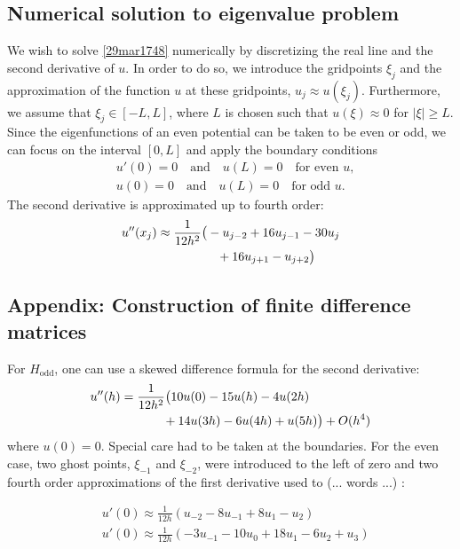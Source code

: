 \documentclass[twocolumn]{article}
\begin{document}
\begin{large}
\subsection*{Numerical solution to eigenvalue problem}
We wish to solve \eqref{29mar1748} numerically by discretizing the real line and the second derivative of $u$. In order to do so, we introduce the gridpoints $\xi_j$ and the approximation of the function $u$ at these gridpoints, $u_j\approx u(\xi_j)$. Furthermore, we assume that $\xi_j\in[-L,L]$, where $L$ is chosen such that $u(\xi)\approx 0$ for $|\xi|\geq L$. Since the eigenfunctions of an even potential can be taken to be even or odd, we can focus on the interval $[0,L]$ and apply the boundary conditions 
\begin{equation}
    \begin{split}
        &u'(0) = 0 \quad\text{and}\quad u(L) = 0 \quad \text{for even } u, \\ 
        &u(0) = 0 \quad\text{and}\quad u(L) = 0 \quad \text{for odd } u.
    \end{split}
\end{equation} 
The second derivative is approximated up to fourth order:
\begin{equation}
    \begin{split}
        u''(x_j) &\approx \frac{1}{12h^2}\big(-u_{j-2}+16u_{j-1}-30u_j \\ 
        &\hspace{1.7cm}+16u_{j+1}-u_{j+2}\big) 
    \end{split}
\end{equation}

\newpage
\newpage
\subsection*{Appendix: Construction of finite difference matrices}
For $H_\text{odd}$, one can use a skewed difference formula for the second derivative:
\begin{equation}
    \begin{split}
    u''(h) &= \frac{1}{12h^2}\big(10u(0)-15u(h)-4u(2h) \\
    &\hspace{1.2cm} +14u(3h)-6u(4h)+u(5h)\big) + O(h^4)
    \end{split}
\end{equation}
where $u(0) = 0$. 
Special care had to be taken at the boundaries. For the even case, two ghost points, $\xi_{-1}$ and $\xi_{-2}$, were introduced to the left of zero and two fourth order approximations of the first derivative used to  (... words ...) :

\begin{equation}
    \begin{split}
        &u'(0) \approx \frac{1}{12h}\left(u_{-2}-8u_{-1}+8u_1-u_2\right) \\ 
        &u'(0) \approx \frac{1}{12h}\left(-3u_{-1}-10u_0+18u_1-6u_2+u_3\right)
    \end{split}
\end{equation}

\end{large}
\end{document}
